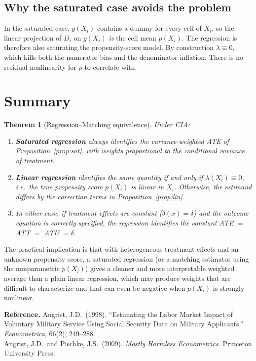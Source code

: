 \documentclass[11pt]{article}
\newtheorem{theorem}{Theorem}
\theoremstyle{remark}
\begin{document}
\subsection{Why the saturated case avoids the problem}

In the saturated case, $g(X_i)$ contains a dummy for every cell of $X_i$, so the
linear projection of $D_i$ on $g(X_i)$ \emph{is} the cell mean $p(X_i)$.  The
regression is therefore also saturating the propensity-score model.  By construction
$\lambda \equiv 0$, which kills both the numerator bias and the denominator inflation.
There is no residual nonlinearity for $\rho$ to correlate with.

\section{Summary}

\begin{theorem}[Regression--Matching equivalence]\label{thm:main}
Under CIA:
\begin{enumerate}
  \item[(a)] \textbf{Saturated regression} always identifies the variance-weighted ATE
             of Proposition~\ref{prop:sat}, with weights proportional to the
             conditional variance of treatment.

  \item[(b)] \textbf{Linear regression} identifies the same quantity if and only if
             $\lambda(X_i) \equiv 0$, i.e.\ the true propensity score $p(X_i)$ is
             linear in $X_i$.  Otherwise, the estimand differs by the correction terms
             in Proposition~\ref{prop:lin}.

  \item[(c)] In either case, if treatment effects are constant ($\delta(x)=\delta$)
             \emph{and} the outcome equation is correctly specified, the regression
             identifies the constant ATE $=$ ATT $=$ ATU $= \delta$.
\end{enumerate}
\end{theorem}

\noindent The practical implication is that with heterogeneous treatment effects and
an unknown propensity score, a saturated regression (or a matching estimator using the
nonparametric $p(X_i)$) gives a cleaner and more interpretable weighted average than a
plain linear regression, which may produce weights that are difficult to characterize
and that can even be negative when $p(X_i)$ is strongly nonlinear.

\bigskip
\noindent\textbf{Reference.}
Angrist, J.D.\ (1998). ``Estimating the Labor Market Impact of Voluntary Military
Service Using Social Security Data on Military Applicants.'' \textit{Econometrica},
66(2), 249--288.\\[2pt]
Angrist, J.D.\ and Pischke, J.S.\ (2009). \textit{Mostly Harmless Econometrics}.
Princeton University Press.
\end{document}
